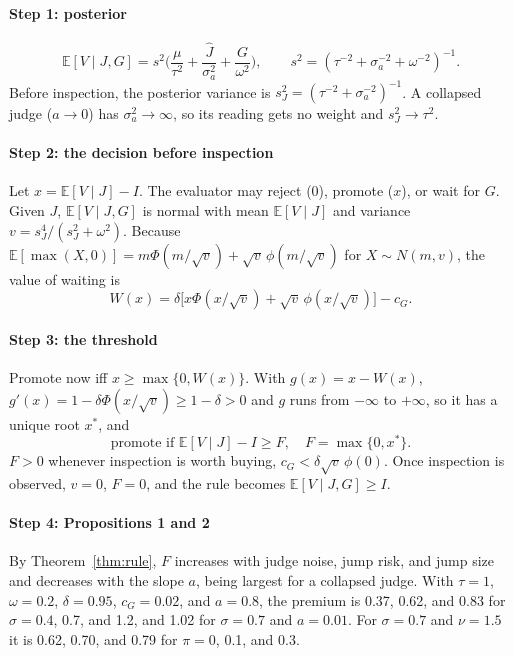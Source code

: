 \documentclass[acmsmall,screen,review,anonymous]{acmart}
\theoremstyle{acmdefinition}
\begin{document}
\paragraph{Step 1: posterior}
\begin{equation*}
\mathbb{E}[V \mid J,G] = s^2\Big(\frac{\mu}{\tau^2} + \frac{\hat{J}}{\sigma_a^2} + \frac{G}{\omega^2}\Big), \qquad s^2 = (\tau^{-2} + \sigma_a^{-2} + \omega^{-2})^{-1}.
\end{equation*}
Before inspection, the posterior variance is $s_J^2 = (\tau^{-2} + \sigma_a^{-2})^{-1}$. A collapsed judge ($a \to 0$) has $\sigma_a^2 \to \infty$, so its reading gets no weight and $s_J^2 \to \tau^2$.

\paragraph{Step 2: the decision before inspection} Let $x = \mathbb{E}[V \mid J] - I$. The evaluator may reject (0), promote ($x$), or wait for $G$. Given $J$, $\mathbb{E}[V \mid J,G]$ is normal with mean $\mathbb{E}[V\mid J]$ and variance $v = s_J^4/(s_J^2 + \omega^2)$. Because $\mathbb{E}[\max(X,0)] = m\Phi(m/\sqrt{v}) + \sqrt{v}\,\phi(m/\sqrt{v})$ for $X \sim N(m,v)$, the value of waiting is
\begin{equation*}
W(x) = \delta\big[x\Phi(x/\sqrt{v}) + \sqrt{v}\,\phi(x/\sqrt{v})\big] - c_G.
\end{equation*}

\paragraph{Step 3: the threshold} Promote now iff $x \ge \max\{0, W(x)\}$. With $g(x) = x - W(x)$, $g'(x) = 1 - \delta\Phi(x/\sqrt{v}) \ge 1 - \delta > 0$ and $g$ runs from $-\infty$ to $+\infty$, so it has a unique root $x^*$, and
\begin{equation}
\text{promote if } \mathbb{E}[V\mid J] - I \ge F, \quad F = \max\{0, x^*\}. \tag{A.1}
\end{equation}
$F > 0$ whenever inspection is worth buying, $c_G < \delta\sqrt{v}\,\phi(0)$. Once inspection is observed, $v = 0$, $F = 0$, and the rule becomes $\mathbb{E}[V\mid J,G] \ge I$.

\paragraph{Step 4: Propositions 1 and 2} By Theorem~\ref{thm:rule}, $F$ increases with judge noise, jump risk, and jump size and decreases with the slope $a$, being largest for a collapsed judge. With $\tau = 1$, $\omega = 0.2$, $\delta = 0.95$, $c_G = 0.02$, and $a = 0.8$, the premium is 0.37, 0.62, and 0.83 for $\sigma = 0.4$, 0.7, and 1.2, and 1.02 for $\sigma = 0.7$ and $a = 0.01$. For $\sigma = 0.7$ and $\nu = 1.5$ it is 0.62, 0.70, and 0.79 for $\pi = 0$, 0.1, and 0.3.
\end{document}
